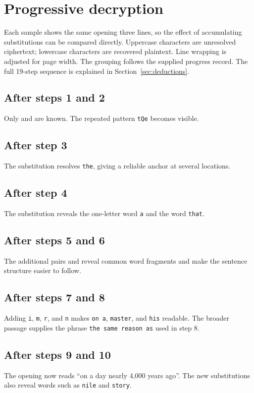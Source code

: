 \section{Progressive decryption}
\label{sec:progress}
Each sample shows the same opening three lines, so the effect of accumulating substitutions can be compared directly. Uppercase characters are unresolved ciphertext; lowercase characters are recovered plaintext. Line wrapping is adjusted for page width. The grouping follows the supplied progress record. The full 19-step sequence is explained in Section~\ref{sec:deductions}.

\subsection{After steps 1 and 2}
Only  and  are known. The repeated pattern \texttt{tQe} becomes visible.

\subsection{After step 3}
The substitution  resolves \texttt{the}, giving a reliable anchor at several locations.

\subsection{After step 4}
The substitution  reveals the one-letter word \texttt{a} and the word \texttt{that}.

\subsection{After steps 5 and 6}
The additional pairs  and  reveal common word fragments and make the sentence structure easier to follow.

\subsection{After steps 7 and 8}
Adding \texttt{i}, \texttt{m}, \texttt{r}, and \texttt{n} makes \texttt{on a}, \texttt{master}, and \texttt{his} readable. The broader passage supplies the phrase \texttt{the same reason as} used in step 8.

\subsection{After steps 9 and 10}
The opening now reads ``on a day nearly 4,000 years ago''. The new substitutions also reveal words such as \texttt{nile} and \texttt{story}.

